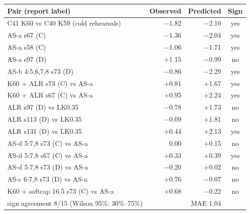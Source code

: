 {\footnotesize
\begin{tabular}{@{}p{6.4cm}rrc@{}}
\toprule
Pair (report label) & Observed & Predicted & Sign \\
\midrule
C41 K60 vs C40 K59 (cold rehearsals) & \ensuremath{-}1.82 & \ensuremath{-}2.10 & yes \\
AS-a s67 (C) & \ensuremath{-}1.36 & \ensuremath{-}2.04 & yes \\
AS-a s58 (C) & \ensuremath{-}1.06 & \ensuremath{-}1.71 & yes \\
AS-a s97 (D) & \ensuremath{+}1.15 & \ensuremath{-}0.99 & no \\
AS-b 4:5,6,7,8 s73 (D) & \ensuremath{-}0.86 & \ensuremath{-}2.29 & yes \\
K60 + ALR s73 (C) vs AS-a & \ensuremath{+}0.81 & \ensuremath{+}1.67 & yes \\
K60 + ALR s67 (C) vs AS-a & \ensuremath{+}0.95 & \ensuremath{+}2.24 & yes \\
ALR s97 (D) vs LK0.35 & \ensuremath{-}0.78 & \ensuremath{+}1.73 & no \\
ALR s113 (D) vs LK0.35 & \ensuremath{-}0.09 & \ensuremath{+}1.81 & no \\
ALR s131 (D) vs LK0.35 & \ensuremath{+}0.44 & \ensuremath{+}2.13 & yes \\
AS-d 5:7,8 s73 (C) vs AS-a & 0.00 & \ensuremath{+}0.15 & no \\
AS-d 5:7,8 s67 (C) vs AS-a & \ensuremath{+}0.33 & \ensuremath{+}0.39 & yes \\
AS-d 5:7,8 s73 (D) vs AS-a & \ensuremath{-}0.20 & \ensuremath{+}0.02 & no \\
AS-c 6:7,8 s73 (D) vs AS-a & \ensuremath{+}0.76 & \ensuremath{-}0.07 & no \\
K60 + softcap 16.5 s73 (C) vs AS-a & \ensuremath{+}0.68 & \ensuremath{-}0.22 & no \\
\midrule
sign agreement 8/15 (Wilson 95\%: 30\%--75\%) & & MAE 1.04 & \\
\bottomrule
\end{tabular}
}
